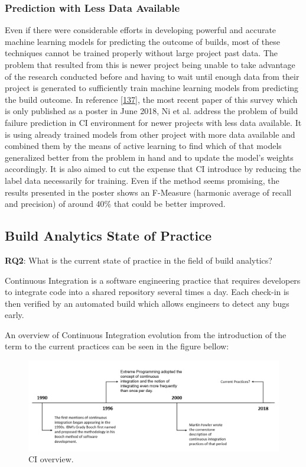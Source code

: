 \documentclass[]{book}
\begin{document}
\subsubsection{Prediction with Less Data
Available}\label{prediction-with-less-data-available}

Even if there were considerable efforts in developing powerful and
accurate machine learning models for predicting the outcome of builds,
most of these techniques cannot be trained properly without large
project past data. The problem that resulted from this is newer project
being unable to take advantage of the research conducted before and
having to wait until enough data from their project is generated to
sufficiently train machine learning models from predicting the build
outcome. In reference {[}\protect\hyperlink{ref-ni2018acona}{137}{]},
the most recent paper of this survey which is only published as a poster
in June 2018, Ni et al. address the problem of build failure prediction
in CI environment for newer projects with less data available. It is
using already trained models from other project with more data available
and combined them by the means of active learning to find which of that
models generalized better from the problem in hand and to update the
model's weights accordingly. It is also aimed to cut the expense that CI
introduce by reducing the label data necessarily for training. Even if
the method seems promising, the results presented in the poster shows an
F-Measure (harmonic average of recall and precision) of around 40\% that
could be better improved.

\subsection{Build Analytics State of
Practice}\label{build-analytics-state-of-practice}

\textbf{RQ2}: What is the current state of practice in the field of
build analytics?

Continuous Integration is a software engineering practice that requires
developers to integrate code into a shared repository several times a
day. Each check-in is then verified by an automated build which allows
engineers to detect any bugs early.

An overview of Continuous Integration evolution from the introduction of
the term to the current practices can be seen in the figure bellow:

\begin{figure}
\centering
\includegraphics{figures/build-analytics/state_pr.png}
\caption{CI overview.}
\end{figure}
\end{document}
